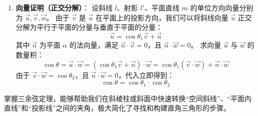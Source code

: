 \documentclass[11pt,a4paper]{ctexart}
\begin{document}
\begin{proof*}
\begin{enumerate}
\begin{center}
    \end{center}
    
    在斜线 $l$ 上取一点 $P$，作 $PQ \perp \text{平面 } \alpha$ 于点 $Q$，则点 $Q$ 落在射影 $l'$ 上，且 $\triangle PQA_1$ 为直角三角形（$\angle PQA_1 = 90^\circ$），有：
    \[ A_1Q = A_1P \cdot \cos\theta_1 \]
    在平面 $\alpha$ 内，作 $QR \perp m$ 于点 $R$，连接 $PR$。
    因为 $PQ \perp \text{平面 } \alpha$，且 $QR \perp m$，根据三垂线定理，斜线 $PR \perp m$。
    因此，$\triangle PRA_1$ 和 $\triangle QRA_1$ 均为直角三角形（$\angle PRA_1 = 90^\circ, \angle QRA_1 = 90^\circ$）。
    在直角三角形 $\triangle QRA_1$ 中，有：
    \[ A_1R = A_1Q \cdot \cos\theta_2 \]
    在直角三角形 $\triangle PRA_1$ 中，有：
    \[ A_1R = A_1P \cdot \cos\theta \]
    将第一步的 $A_1Q$ 代入，得：
    \[ A_1R = (A_1P \cdot \cos\theta_1) \cdot \cos\theta_2 \]
    结合 $A_1R = A_1P \cdot \cos\theta$，消去 $A_1P$ 即可得到：
    \[ \cos\theta = \cos\theta_1 \cdot \cos\theta_2 \]
    
    \item \textbf{向量证明（正交分解）}：
    设斜线 $l$、射影 $l'$、平面直线 $m$ 的单位方向向量分别为 $\vec{u}, \vec{v}, \vec{w}$。
    由于 $\vec{v}$ 是 $\vec{u}$ 在平面上的投影方向，我们可以将斜线向量 $\vec{u}$ 正交分解为平行于平面的分量与垂直于平面的分量：
    \[ \vec{u} = \cos\theta_1 \vec{v} + \vec{n} \]
    其中 $\vec{n}$ 为平面 $\alpha$ 的法向量，满足 $\vec{n} \cdot \vec{v} = 0$，且 $\vec{n} \cdot \vec{w} = 0$。
    求向量 $\vec{u}$ 与 $\vec{w}$ 的数量积：
    \[ \cos\theta = \vec{u} \cdot \vec{w} = (\cos\theta_1 \vec{v} + \vec{n}) \cdot \vec{w} = \cos\theta_1 (\vec{v} \cdot \vec{w}) + \vec{n} \cdot \vec{w} \]
    由于 $\vec{v} \cdot \vec{w} = \cos\theta_2$，且 $\vec{n} \cdot \vec{w} = 0$，代入立即得到：
    \[ \cos\theta = \cos\theta_1 \cdot \cos\theta_2 \]
\end{enumerate}
掌握三余弦定理，能够帮助我们在斜棱柱或斜面中快速转换“空间斜线”、“平面内直线”和“投影线”之间的夹角，极大简化了寻找和构建直角三角形的步骤。
\vspace{0.2cm}


\end{proof*}
\end{document}
